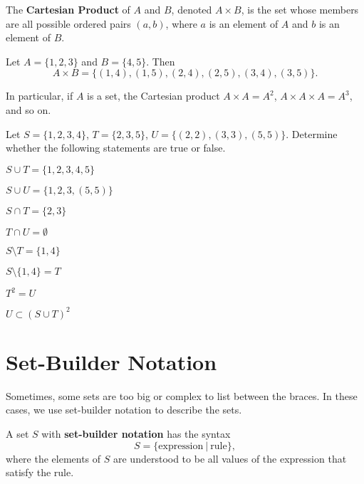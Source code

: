 \begin{definition}
    The \textbf{Cartesian Product} of $A$ and $B$, denoted $A \times B$, is the set whose members are all possible ordered pairs $(a, b)$, where $a$ is an element of $A$ and $b$ is an element of $B$.
\end{definition}
\begin{example}
    Let $A = \{1, 2, 3\}$ and $B = \{4, 5\}$. Then
    \[
        A \times B = \{(1, 4), (1, 5), (2, 4), (2, 5), (3, 4), (3, 5)\}.
    \]
\end{example}
\begin{remark}
    In particular, if $A$ is a set, the Cartesian product $A \times A = A^2$, $A\times A \times A = A^3$, and so on.
\end{remark}

\begin{exercise}
    Let $S = \{1, 2, 3, 4\}$, $T = \{2, 3, 5\}$, $U = \{(2, 2), (3, 3), (5, 5)\}$. Determine whether the following statements are true or false.
    \begin{multicols}{2}
        \begin{partquestions}{\alph*}
            \item $S \cup T = \{1, 2, 3, 4, 5\}$
            \item $S \cup U = \{1, 2, 3, (5, 5)\}$
            \item $S \cap T = \{2, 3\}$
            \item $T \cap U = \emptyset$
            \item $S \setminus T = \{1, 4\}$
            \item $S \setminus \{1, 4\} = T$
            \item $T^2 = U$
            \item $U \subset (S \cup T)^2$
        \end{partquestions}
    \end{multicols}
\end{exercise}

\newpage

\section{Set-Builder Notation}
Sometimes, some sets are too big or complex to list between the braces. In these cases, we use set-builder notation to describe the sets.
\begin{definition}
    A set $S$ with \textbf{set-builder notation} has the syntax
    \[
        S = \{\mathrm{expression} \ | \ \mathrm{rule}\},
    \]
    where the elements of $S$ are understood to be all values of the {\normalfont expression} that satisfy the {\normalfont rule}.
\end{definition}

